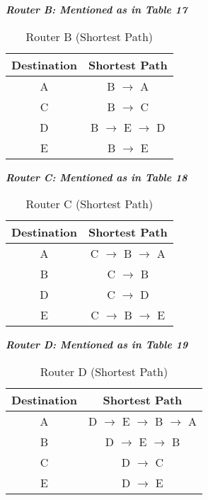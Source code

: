 \documentclass[12pt]{article}
\begin{document}
\begin{enumerate}
\textit{\textbf{Router B: Mentioned as in Table 17}} \\

\begin{table}[]
\begin{center}
\begin{tabular}{|c|c|}
\hline
Destination & Shortest Path                                     \\ \hline
A           & B $\rightarrow$ A                                 \\ \hline
C           & B $\rightarrow$ C                 \\ \hline
D           & B $\rightarrow$ E $\rightarrow$ D \\ \hline
E           & B $\rightarrow$ E                 \\ \hline
\end{tabular}
\caption{Router B (Shortest Path)}
\end{center}
\end{table}

\textit{\textbf{Router C: Mentioned as in Table 18}} \\

\begin{table}[]
\begin{center}
\begin{tabular}{|c|c|}
\hline
Destination & Shortest Path                                     \\ \hline
A           & C $\rightarrow$ B $\rightarrow$ A                                 \\ \hline
B           & C $\rightarrow$ B                 \\ \hline
D           & C $\rightarrow$ D \\ \hline
E           & C $\rightarrow$ B $\rightarrow$ E                 \\ \hline
\end{tabular}
\caption{Router C (Shortest Path)}
\end{center}
\end{table}

\textit{\textbf{Router D: Mentioned as in Table 19}} \\

\begin{table}[]
\begin{center}
\begin{tabular}{|c|c|}
\hline
Destination & Shortest Path                                     \\ \hline
A           & D $\rightarrow$ E $\rightarrow$ B $\rightarrow$ A                                 \\ \hline
B           & D $\rightarrow$ E $\rightarrow$ B                 \\ \hline
C           & D $\rightarrow$ C \\ \hline
E           & D $\rightarrow$ E                 \\ \hline
\end{tabular}
\caption{Router D (Shortest Path)}
\end{center}
\end{table}


\end{enumerate}
\end{document}
